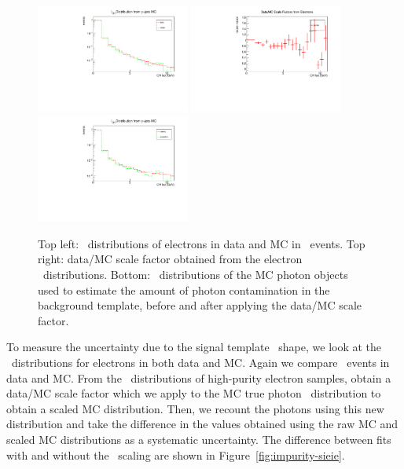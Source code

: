 \begin{figure}[htbp]
  \centering
  \includegraphics[width=0.45\textwidth]{Calibration/Figures/pvsf/chiso_electrons_logy.pdf}
  \includegraphics[width=0.45\textwidth]{Calibration/Figures/pvsf/chiso_scale.pdf}
  \includegraphics[width=0.45\textwidth]{Calibration/Figures/pvsf/chiso_photons_logy.pdf}
  \caption{
    Top left: \ICH\ distributions of electrons in data and MC in \Zee\ events.
    Top right: data/MC scale factor obtained from the electron \ICH\ distributions.
    Bottom: \ICH\ distributions of the MC photon objects used to estimate the amount of photon contamination in the background
    template, before and after applying the data/MC scale factor.
  }
  \label{fig:impurity-chiso}
\end{figure}

To measure the uncertainty due to the signal template \sieie\ shape, we look at the \sieie\ distributions for electrons in both data and MC. Again we compare \Zee\ events in data and MC.
From the \sieie\ distributions of high-purity electron samples, obtain a data/MC scale factor which we apply to the MC true photon \sieie\ distribution to obtain a scaled MC distribution.
Then, we recount the photons using this new distribution and take the difference in the values obtained using the raw MC and scaled MC distributions as a systematic uncertainty. 
The difference between fits with and without the \sieie\ scaling are shown in Figure~\ref{fig:impurity-sieie}.

